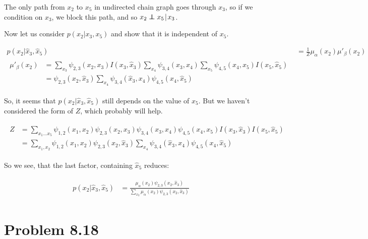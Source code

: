 \documentclass[fleqn]{article}
\newcommand\independent{\protect\mathpalette{\protect\independenT}{\perp}}
\def\independenT#1#2{\mathrel{\rlap{$#1#2$}\mkern2mu{#1#2}}}
\begin{document}
The only path from $x_2$ to $x_5$ in undirected chain graph goes through $x_3$, so if we condition on $x_3$, we block this path, and so $x_2 \independent x_5 \mkern2mu | \mkern2mu x_3$.

Now let us consider $p(x_2 | x_3, x_5)$ and show that it is independent of $x_5$. 

\begin{align}
	p(x_2 | \hat x_3, \hat x_5) &= \frac{1}{Z}\mu_\alpha(x_2)\mu'_\beta(x_2) \\
	\begin{split}
	\mu'_\beta(x_2) &= \sum\limits_{x_3}\psi_{2,3}(x_2, x_3) I(x_3, \hat x_3)  \sum\limits_{x_4}\psi_{3,4}(x_3, x_4) \sum\limits_{x_5}\psi_{4,5}(x_4, x_5) I(x_5, \hat x_5) \\
	&=  \psi_{2,3}(x_2, \hat x_3)  \sum\limits_{x_4}\psi_{3,4}(\hat x_3, x_4)  \psi_{4,5}(x_4, \hat x_5)  
	\end{split}
\end{align}

So, it seems that $p(x_2| \hat x_3, \hat x_5)$ still depends on the value of $\hat x_5$. But we haven't considered the form of $Z$, which probably will help.

\begin{align}
	\begin{split}
	Z &= \sum\limits_{x_1...x_5}\psi_{1,2}(x_1, x_2)\psi_{2,3}(x_2, x_3)\psi_{3,4}(x_3, x_4)\psi_{4,5}(x_4, x_5)I(x_3,\hat x_3) I(x_5, \hat x_5) \\ 
	&=  \sum\limits_{x_1,x_2}\psi_{1,2}(x_1, x_2) \psi_{2,3}(x_2, \hat x_3) \sum\limits_{x_4}\psi_{3,4}(\hat x_3, x_4)\psi_{4,5}(x_4, \hat x_5)
	\end{split}
\end{align}

So we see, that the last factor, containing $\hat x_5$ reduces:

\begin{align}
	\begin{split}
		p(x_2 | \hat x_3, \hat x_5) &= \frac{\mu_\alpha(x_2) \psi_{2,3}(x_2, \hat x_3)}{\sum\limits_{x_2}\mu_\alpha(x_2) \psi_{2,3}(x_2, \hat x_3)}
	\end{split}
\end{align}

\section*{Problem 8.18}
\end{document}
